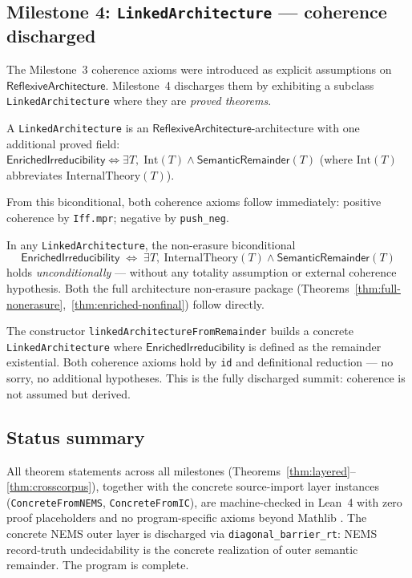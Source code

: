 \documentclass[11pt]{article}
\newcommand{\SemRem}{\ensuremath{\mathsf{SemanticRemainder}}}
\newcommand{\RAL}{\ensuremath{\mathsf{ReflexiveArchitecture}}}
\newcommand{\EnrIrr}{\ensuremath{\mathsf{EnrichedIrreducibility}}}
\begin{document}
\subsection{Milestone 4: \texttt{LinkedArchitecture} --- coherence discharged}

The Milestone~3 coherence axioms were introduced as explicit assumptions on $\RAL$.
Milestone~4 discharges them by exhibiting a subclass \texttt{LinkedArchitecture} where
they are \emph{proved theorems}.

\begin{definition}
\label{def:linked}\sloppy
A \texttt{LinkedArchitecture} is an $\RAL$-architecture with one additional proved field:
$\EnrIrr \iff \exists T,\; \mathrm{Int}(T) \wedge \SemRem(T)$
(where $\mathrm{Int}(T)$ abbreviates $\mathrm{InternalTheory}(T)$).
\end{definition}

From this biconditional, both coherence axioms follow immediately: positive coherence
by \texttt{Iff.mpr}; negative by \texttt{push\_neg}.

\begin{theorem}
\label{thm:linked}
In any \texttt{LinkedArchitecture}, the non-erasure biconditional
\[
\EnrIrr \;\Longleftrightarrow\; \exists T,\ \mathrm{InternalTheory}(T) \wedge \SemRem(T)
\]
holds \emph{unconditionally} --- without any totality assumption or external coherence
hypothesis.  Both the full architecture non-erasure package
(Theorems~\ref{thm:full-nonerasure},~\ref{thm:enriched-nonfinal}) follow directly.
\par{}
\end{theorem}

The constructor \texttt{linkedArchitectureFromRemainder} builds a concrete
\texttt{LinkedArchitecture} where $\EnrIrr$ is defined as the remainder existential.
Both coherence axioms hold by \texttt{id} and definitional reduction --- no sorry, no
additional hypotheses.  This is the fully discharged summit: coherence is not assumed
but derived.

\subsection{Status summary}

All theorem statements across all milestones
(Theorems~\ref{thm:layered}--\ref{thm:crosscorpus}), together with the concrete
source-import layer instances (\texttt{ConcreteFromNEMS}, \texttt{ConcreteFromIC}),
are machine-checked in Lean~4 with zero proof placeholders and no program-specific
axioms beyond Mathlib \cite{Mathlib2020}.  The concrete NEMS outer layer is
discharged via \texttt{diagonal\_barrier\_rt}: NEMS record-truth undecidability
is the concrete realization of outer semantic remainder.  The program is complete.
\end{document}
